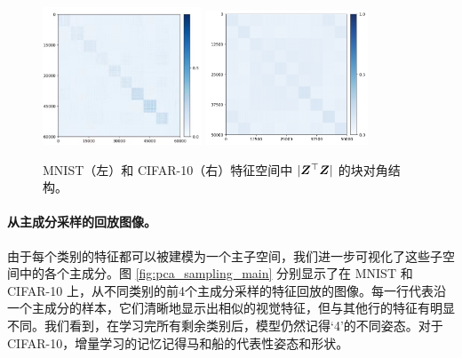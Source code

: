 \documentclass[../../book-main.tex]{subfiles}
\begin{document}
\begin{figure}[tb]
\centering
\includegraphics[height=4.1cm]{figs_chap6/Heatmap_MNIST.jpg}  \includegraphics[height=4cm]{figs_chap6/Heatmap_CIFAR10.png}
\caption{\small MNIST（左）和 CIFAR-10（右）特征空间中 $|\bm{Z}^\top \bm{Z}|$ 的块对角结构。}
\label{fig:cifar_10_pca_sampling_main}
\end{figure}



\paragraph{从主成分采样的回放图像。}
由于每个类别的特征都可以被建模为一个主子空间，我们进一步可视化了这些子空间中的各个主成分。图 \ref{fig:pca_sampling_main} 分别显示了在 MNIST 和 CIFAR-10 上，从不同类别的前4个主成分采样的特征回放的图像。每一行代表沿一个主成分的样本，它们清晰地显示出相似的视觉特征，但与其他行的特征有明显不同。我们看到，在学习完所有剩余类别后，模型仍然记得‘4’的不同姿态。对于 CIFAR-10，增量学习的记忆记得马和船的代表性姿态和形状。
\end{document}
